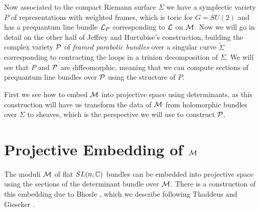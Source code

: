 	\pagebreak
	Now associated to the compact Riemann surface $\Sigma$ we have a symplectic variety $P$ of representations with weighted frames, which is toric for $G=SU(2)$ and has a prequantum line bundle $\mathcal{L}_P$ corresponding to $\mathcal{L}$ on $\mathcal{M}$. Now we will go in detail on the other half of Jeffrey and Hurtubise's construction, building the complex variety $\mathcal{P}$ of \emph{framed parabolic bundles} over a singular curve $\tilde{\Sigma}$ corresponding to contracting the loops in a trinion decomposition of $\Sigma$. We will see that $P$ and $\mathcal{P}$ are diffeomorphic, meaning that we can compute sections of prequantum line bundles over $\mathcal{P}$ using the structure of $P$.
	
	First we see how to embed $\mathcal{M}$ into projective space using determinants, as this construction will have us transform the data of $\mathcal{M}$ from holomorphic bundles over $\Sigma$ to sheaves, which is the perspective we will use to construct $\mathcal{P}$.
	\section{Projective Embedding of $\mathcal{M}$}
	\label{s:m-embedding}
	The moduli $\mathcal{M}$ of flat $SL(n,\mathbb{C})$ bundles can be embedded into projective space using the sections of the determinant bundle over $\mathcal{M}$. There is a construction of this embedding due to Bhosle \cite{bhosle_parabolic_1989}, which we describe following Thaddeus and Gieseker \cite[\S 7]{thaddeus_geometric_1996}\cite{gieseker_moduli_1977}. 
	
